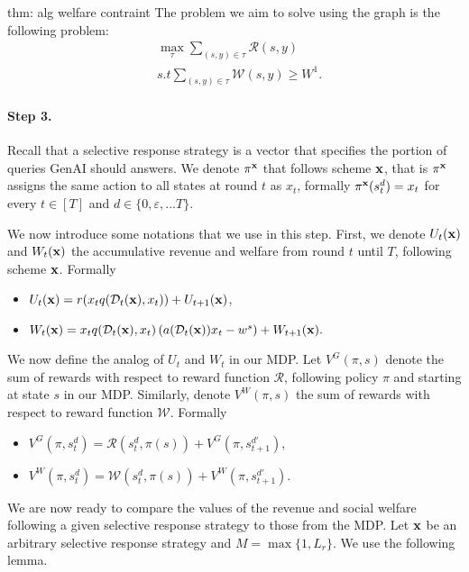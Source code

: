 \begin{proofof}{thm: alg welfare contraint}
The problem we aim to solve using the graph is the following problem:
\begin{align}
& \max_{\tau} \sum_{(s, y) \in \tau} \mathcal{R}(s, y) \tag{P3} \label{eq: approx max U welfare} \\
& \nonumber s.t \sum_{(s, y) \in \tau} \mathcal{W}(s, y) \geq W^1.
\end{align}





\paragraph{Step 3.}
Recall that a selective response strategy is a vector that specifies the portion of queries GenAI should answers. 
We denote $\pi^{{\bf{x}}}$ that follows scheme ${\bf{x}}$, that is $\pi^{{\bf{x}}}$ assigns the same action to all states at round $t$ as $x_t$, formally $\pi^{{\bf{x}}}(s_t^d) = x_t$ for every $t \in [T]$ and $d \in \{0, \varepsilon, \ldots T \}$.

We now introduce some notations that we use in this step. First, we denote $U_t({\bf{x}})$ and $W_t({\bf{x}})$ the accumulative revenue and welfare from round $t$ until $T$, following scheme ${\bf{x}}$. Formally 
\begin{itemize}
\item $U_t({\bf{x}}) = r(x_t q(\mathcal{D}_t({\bf{x}}), x_t)) + U_{t+1}({\bf{x}})$,
\item $W_t({\bf{x}}) =  x_t q(\mathcal{D}_t({\bf{x}}), x_t)\left( a(\mathcal{D}_t({\bf{x}}))x_t - w^s \right) + W_{t+1}({\bf{x}}).$
\end{itemize}

We now define the analog of $U_t$ and $W_t$ in our MDP. Let $V^{G}(\pi, s)$ denote the sum of rewards with respect to reward function $\mathcal{R}$, following policy $\pi$ and starting at state $s$ in our MDP. Similarly, denote $V^{W}(\pi, s)$ the sum of rewards with respect to reward function $\mathcal{W}$. Formally
\begin{itemize}
\item $V^G(\pi, s_t^d) = \mathcal{R}(s_t^d, \pi(s)) + V^G(\pi, s_{t+1}^{d'})$,
\item $V^W(\pi, s_t^d) = \mathcal{W}(s_t^d, \pi(s)) + V^W(\pi, s_{t+1}^{d'})$.
\end{itemize}

We are now ready to compare the values of the revenue and social welfare following a given selective response strategy to those from the MDP. Let ${\bf{x}}$ be an arbitrary selective response strategy and $M = \max \{1, L_r \}$. We use the following lemma.


\end{proofof}
